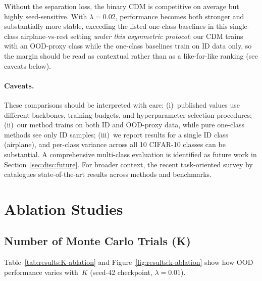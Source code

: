 Without the separation loss, the binary CDM is competitive on average
but highly seed-sensitive. With $\lambda{=}0.02$, performance becomes
both stronger and substantially more stable, exceeding the listed
one-class baselines in this single-class airplane-vs-rest setting
\emph{under this asymmetric protocol}: our CDM trains with an OOD-proxy
class while the one-class baselines train on ID data only, so the
margin should be read as contextual rather than as a like-for-like
ranking (see caveats below).

\paragraph{Caveats.}
These comparisons should be interpreted with care:
(i)~published values use different backbones, training budgets, and
hyperparameter selection procedures;
(ii)~our method trains on both ID and OOD-proxy data, while pure
one-class methods see only ID samples;
(iii)~we report results for a single ID class
(airplane), and per-class variance across all 10 CIFAR-10 classes can be
substantial.
A comprehensive multi-class evaluation is identified as future work in
Section~\ref{sec:disc:future}.
For broader context, the recent task-oriented survey by
\textcite{lu2025ood} catalogues state-of-the-art results across methods
and benchmarks.

\section{Ablation Studies}
\label{sec:results:ablations}

\subsection{Number of Monte Carlo Trials (K)}
\label{sec:results:ablations:K}

Table~\ref{tab:results:K-ablation} and
Figure~\ref{fig:results:k-ablation} show how OOD performance varies
with~$K$ (seed-42 checkpoint, $\lambda = 0.01$).

